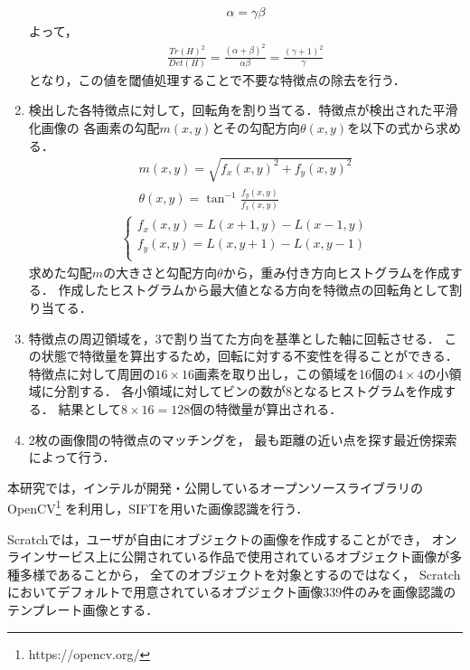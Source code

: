 \documentclass[11pt]{jreport}
\begin{document}
\begin{enumerate}
    \begin{eqnarray}
        \alpha = \gamma\beta
    \end{eqnarray}
    よって，
    \begin{eqnarray}
        \frac{Tr(H)^2}{Det(H)} = \frac{(\alpha + \beta)^2}{\alpha\beta} = \frac{(\gamma + 1)^2}{\gamma}
    \end{eqnarray}
    となり，この値を閾値処理することで不要な特徴点の除去を行う．
    \item {} 検出した各特徴点に対して，回転角を割り当てる．特徴点が検出された平滑化画像の
    各画素の勾配$m(x,y)$とその勾配方向$\theta(x,y)$を以下の式から求める．
    \begin{eqnarray}
        m(x,y) = \sqrt{f_x(x,y)^2 + f_y(x,y)^2} \\ 
        \theta(x,y) = \tan^{-1}\frac{f_y(x,y)}{f_x(x,y)}
    \end{eqnarray}
    \begin{eqnarray}
        \begin{cases}
            {f_x(x,y) = L(x+1,y) - L(x-1,y)} \\
            {f_y(x,y) = L(x,y+1) - L(x,y-1)} \\
        \end{cases}
    \end{eqnarray}
    求めた勾配$m$の大きさと勾配方向$\theta$から，重み付き方向ヒストグラムを作成する．
    作成したヒストグラムから最大値となる方向を特徴点の回転角として割り当てる．
    \item {} 特徴点の周辺領域を，3で割り当てた方向を基準とした軸に回転させる．
    この状態で特徴量を算出するため，回転に対する不変性を得ることができる．
    特徴点に対して周囲の$16×16$画素を取り出し，この領域を16個の$4×4$の小領域に分割する．
    各小領域に対してビンの数が8となるヒストグラムを作成する．
    結果として$8×16=128$個の特徴量が算出される．
    \item {} 2枚の画像間の特徴点のマッチングを，
    最も距離の近い点を探す最近傍探索によって行う．
\end{enumerate}

本研究では，インテルが開発・公開しているオープンソースライブラリのOpenCV\footnote{https://opencv.org/}
を利用し，SIFTを用いた画像認識を行う．

Scratchでは，ユーザが自由にオブジェクトの画像を作成することができ，
オンラインサービス上に公開されている作品で使用されているオブジェクト画像が多種多様であることから，
全てのオブジェクトを対象とするのではなく，
Scratchにおいてデフォルトで用意されているオブジェクト画像339件のみを画像認識のテンプレート画像とする．
\end{document}
